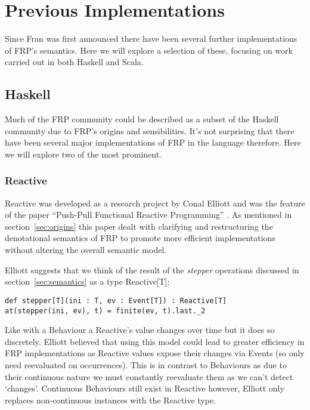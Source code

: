 \chapter{Previous Implementations}
  Since Fran was first announced there have been several further implementations of FRP's semantics. Here
  we will explore a selection of these, focusing on work carried out in both Haskell and Scala.
  
  \section{Haskell}
    Much of the FRP community could be described as a subset of the Haskell community due to FRP's
    origins and sensibilities. It's not surprising that there have been several major implementations
    of FRP in the language therefore. Here we will explore two of the most prominent.
    
    \subsection{Reactive}
      Reactive was developed as a research project by Conal Elliott and was the feature
      of the paper ``Push-Pull Functional Reactive Programming'' \cite{Elliott2009}. As mentioned
      in section~\ref{sec:origins} this paper dealt with clarifying and restructuring the denotational
      semantics of FRP
      to promote more efficient implementations without altering the overall semantic model.
      
      Elliott suggests that we think of the result of the \emph{stepper} operations discussed in
      section~\ref{sec:semantics} as a type Reactive[T]:
      
\begin{verbatim}
def stepper[T](ini : T, ev : Event[T]) : Reactive[T]
at(stepper(ini, ev), t) = finite(ev, t).last._2
\end{verbatim}

      Like with a Behaviour a Reactive's value changes over time but it does so discretely. 
      Elliott believed
      that using this model could lead to greater efficiency in FRP implementations as Reactive values
      expose their changes via Events (so only need reevaluated on occurrences). This is
      in contrast to Behaviours as due to their continuous nature we must constantly reevaluate them
      as we can't detect `changes'. Continuous Behaviours still exist in Reactive however, Elliott only replaces     
      non-continuous instances with the Reactive type. 
      

